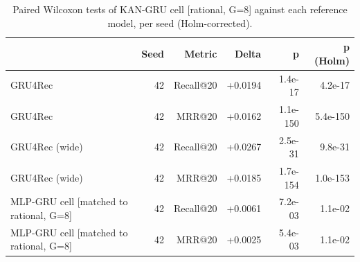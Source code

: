 \begin{table}[H]
\centering\small
\caption{Paired Wilcoxon tests of KAN-GRU cell [rational, G=8] against each reference model, per seed (Holm-corrected).}
\label{tab:key_sig}
\begin{tabular}{lrrrrr}
\toprule
 & Seed & Metric & Delta & p & p (Holm) \\
\midrule
GRU4Rec & 42 & Recall@20 & +0.0194 & 1.4e-17 & 4.2e-17 \\
GRU4Rec & 42 & MRR@20 & +0.0162 & 1.1e-150 & 5.4e-150 \\
GRU4Rec (wide) & 42 & Recall@20 & +0.0267 & 2.5e-31 & 9.8e-31 \\
GRU4Rec (wide) & 42 & MRR@20 & +0.0185 & 1.7e-154 & 1.0e-153 \\
MLP-GRU cell [matched to rational, G=8] & 42 & Recall@20 & +0.0061 & 7.2e-03 & 1.1e-02 \\
MLP-GRU cell [matched to rational, G=8] & 42 & MRR@20 & +0.0025 & 5.4e-03 & 1.1e-02 \\
\bottomrule
\end{tabular}
\end{table}
